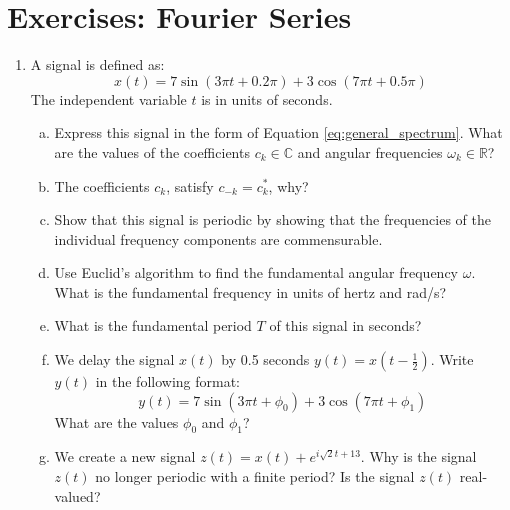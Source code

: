 \newpage
\section{Exercises: Fourier Series}

\begin{enumerate}
  \item A signal is defined as:
        \begin{equation}
          x(t) = 7 \sin(3 \pi t + 0.2\pi) + 3 \cos(7 \pi t + 0.5\pi)
        \end{equation}
        The independent variable $t$ is in units of seconds.
        \begin{enumerate}[a)]
          \item Express this signal in the form of Equation \ref{eq:general_spectrum}. What are the values of the coefficients $c_k \in \mathbb{C}$ and angular frequencies $\omega_k \in \mathbb{R}$?
          \item The coefficients $c_{k}$, satisfy $c_{-k}=c_{k}^{*}$, why?
          \item Show that this signal is periodic by showing that the frequencies of the individual frequency components are commensurable.
          \item Use Euclid's algorithm to find the fundamental angular frequency $\omega$. 
          What is the fundamental frequency in units of hertz and rad/s?
          \item What is the fundamental period $T$ of this signal in seconds?
          \item We delay the signal $x(t)$ by 0.5 seconds $y(t) = x(t-\frac{1}{2})$. 
          Write $y(t)$ in the following format:
                \begin{equation}
                  y(t) = 7 \sin(3\pi t + \phi_0) + 3 \cos(7\pi t + \phi_1)
                \end{equation}
                What are the values $\phi_0$ and $\phi_1$?
          \item We create a new signal $z(t) = x(t) + e^{i \sqrt{2} t + 13}$. 
          Why is the signal $z(t)$ no longer periodic with a finite period? Is the signal $z(t)$ real-valued?
        \end{enumerate}


\end{enumerate}
